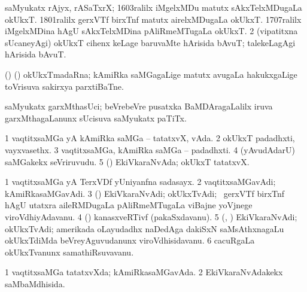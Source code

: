 {{\noindent 
\gl{\pagu}
\expl{}
\bmng
\bnum
{}  
\banum
{} saMyukatx rAjyx, rASaTxrX; 1603ralilx iMgelxMDu matutx sAkxTelxMDugaLa okUkxT. 
 1801ralilx gerxVTf birxTnf matutx airelxMDugaLa okUkxT. 
 1707ralilx iMgelxMDina hAgU sAkxTelxMDina pAliRmeMTugaLa okUkxT. 
\eanum
\numie
\num{2}  (vipatitxna sUcaneyAgi) okUkxT cihenx keLage baruvaMte hArisida bAvuT; talekeLagAgi hArisida bAvuT. 
\enum
\emng
\eentry

\bentry
{} 
\gl{\nA}
\expl{}
\bmng
(\birx) (\AmA) okUkxTmadaRna; kAmiRka saMGagaLige matutx avugaLa hakukxgaLige toVrisuva sakirxya parxtiBaTne. 
\emng
\eentry

\bentry
{}
\gl{\nA}
\expl{}
\bmng
saMyukatx garxMthasUci; beVrebeVre pusatxka BaMDAragaLalilx iruva garxMthagaLanunx sUcisuva saMyukatx paTiTx. 
\emng
\eentry

\bentry
{}
\gl{\nA}
\expl{}
\bmng
{} 
\emng
\eentry

\bentry
{} 
\gl{\sakirx}
\expl{}
\bmng
{} 
\emng
\eentry

\bentry
{} 
\gl{\nA}
\bmng
\bnum
\num{1} vaqtitxsaMGa yA kAmiRka saMGa -- tatatxvX, vAda. 
\num{2} okUkxT padadhxti, vayxvasethx. 
\num{3} vaqtitxsaMGa, kAmiRka saMGa -- padadhxti. 
\num{4} (yAvudAdarU) saMGakekx seVriruvudu. 
\num{5} (\ame) EkiVkaraNvAda; okUkxT tatatxvX. 
\enum
\emng
\eentry

\bentry
{} 
\gl{\nA}
\expl{}
\bmng
\bnum
\num{1} vaqtitxsaMGa yA TerxVDf yUniyanfna sadasayx. 
\num{2} vaqtitxsaMGavAdi; kAmiRkasaMGavAdi. 
\num{3} (\rAshA) EkiVkaraNvAdi; okUkxTvAdi; \kanmu\ gerxVTf birxTnf hAgU utatxra aileRMDugaLa pAliRmeMTugaLa viBajne yoVjnege viroVdhiyAdavanu. 
\num{4} (\pArxparx) kanasxveRTivf (pakaSxdavanu). 
\num{5} (\ame, \ca) EkiVkaraNvAdi; okUkxTvAdi; amerikada oLayudadhx naDedAga dakiSxN saMsAthxnagaLu okUkxTdiMda beVreyAguvudanunx viroVdhisidavanu. 
\num{6} cacuRgaLa okUkxTvanunx samathiRsuvavanu. 
\enum
\emng
\eentry

\bentry
{} 
\gl{\gu}
\expl{}
\bmng
\bnum
\num{1} vaqtitxsaMGa tatatxvXda; kAmiRkasaMGavAda. 
\num{2} EkiVkaraNvAdakekx saMbaMdhisida. 
\enum
\emng
\eentry

}}
